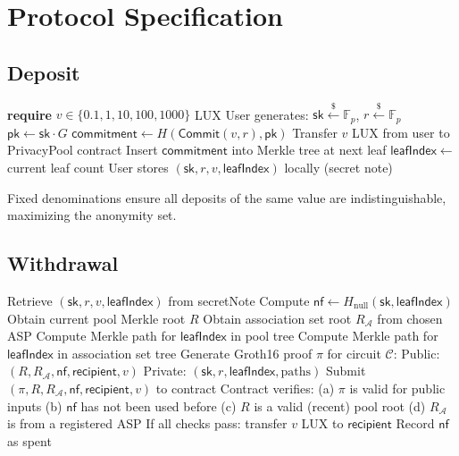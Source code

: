 \section{Protocol Specification}
\label{sec:protocol}

\subsection{Deposit}

\begin{algorithm}[H]
\caption{Privacy Pool Deposit}
\label{alg:deposit}
\begin{algorithmic}[1]
    \State \textbf{require} $v \in \{0.1, 1, 10, 100, 1000\}$ LUX 
    \State User generates: $\mathsf{sk} \xleftarrow{\$} \mathbb{F}_p$, $r \xleftarrow{\$} \mathbb{F}_p$
    \State $\mathsf{pk} \gets \mathsf{sk} \cdot G$
    \State $\mathsf{commitment} \gets H(\mathsf{Commit}(v, r), \mathsf{pk})$
    \State Transfer $v$ LUX from user to PrivacyPool contract
    \State Insert $\mathsf{commitment}$ into Merkle tree at next leaf
    \State $\mathsf{leafIndex} \gets$ current leaf count
    \State User stores $(\mathsf{sk}, r, v, \mathsf{leafIndex})$ locally (secret note)
\EndProcedure
\end{algorithmic}
\end{algorithm}

Fixed denominations ensure all deposits of the same value are indistinguishable, maximizing the anonymity set.

\subsection{Withdrawal}

\begin{algorithm}[H]
\caption{Privacy Pool Withdrawal}
\label{alg:withdraw}
\begin{algorithmic}[1]
    \State Retrieve $(\mathsf{sk}, r, v, \mathsf{leafIndex})$ from secretNote
    \State Compute $\mathsf{nf} \gets H_{\text{null}}(\mathsf{sk}, \mathsf{leafIndex})$
    \State Obtain current pool Merkle root $R$
    \State Obtain association set root $R_{\mathcal{A}}$ from chosen ASP
    \State Compute Merkle path for $\mathsf{leafIndex}$ in pool tree
    \State Compute Merkle path for $\mathsf{leafIndex}$ in association set tree
    \State Generate Groth16 proof $\pi$ for circuit $\mathcal{C}$:
    \State \quad Public: $(R, R_{\mathcal{A}}, \mathsf{nf}, \mathsf{recipient}, v)$
    \State \quad Private: $(\mathsf{sk}, r, \mathsf{leafIndex}, \text{paths})$
    \State Submit $(\pi, R, R_{\mathcal{A}}, \mathsf{nf}, \mathsf{recipient}, v)$ to contract
    \State Contract verifies:
    \State \quad (a) $\pi$ is valid for public inputs
    \State \quad (b) $\mathsf{nf}$ has not been used before
    \State \quad (c) $R$ is a valid (recent) pool root
    \State \quad (d) $R_{\mathcal{A}}$ is from a registered ASP
    \State If all checks pass: transfer $v$ LUX to $\mathsf{recipient}$
    \State Record $\mathsf{nf}$ as spent
\EndProcedure
\end{algorithmic}
\end{algorithm}

